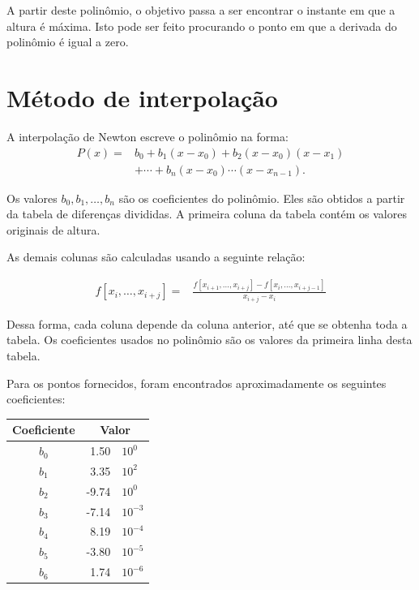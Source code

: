 \documentclass[12pt,brazil,a4paper, twocolumn]{article}
\begin{document}
A partir deste polinômio, o objetivo passa a ser encontrar o instante em que a altura é máxima. Isto pode ser feito procurando o ponto em que a derivada do polinômio é igual a zero.

\section{Método de interpolação}

A interpolação de Newton escreve o polinômio na forma:
\[
\begin{aligned}
P(x) ={}& b_0
+ b_1(x-x_0)
+ b_2(x-x_0)(x-x_1)\\
&+ \cdots
+ b_n(x-x_0)\cdots(x-x_{n-1}).
\end{aligned}
\]

\noindent
Os valores $b_0, b_1, \ldots, b_n$ são os coeficientes do polinômio. Eles são obtidos a partir da tabela de diferenças divididas. A primeira coluna da tabela contém os valores originais de altura.

As demais colunas são calculadas usando a seguinte relação:

\vspace{0.3cm}
\[
\begin{aligned}
f[x_i,\ldots,x_{i+j}]
={}&
\frac{
 f[x_{i+1},\ldots,x_{i+j}]
 -
 f[x_i,\ldots,x_{i+j-1}]
}{x_{i+j}-x_i}
\end{aligned}
\]

\vspace{0.2cm}

Dessa forma, cada coluna depende da coluna anterior, até que se obtenha toda a tabela. Os coeficientes usados no polinômio são os valores da primeira linha desta tabela.

Para os pontos fornecidos, foram encontrados aproximadamente os seguintes coeficientes:

\begin{center}
\begin{tabular}{c|r@{$\,\times\,$}l}
Coeficiente & \multicolumn{2}{c}{Valor}\\
\hline
$b_0$ & 1.50 & $10^{0}$\\
$b_1$ & 3.35 & $10^{2}$\\
$b_2$ & -9.74 & $10^{0}$\\
$b_3$ & -7.14 & $10^{-3}$\\
$b_4$ & 8.19 & $10^{-4}$\\
$b_5$ & -3.80 & $10^{-5}$\\
$b_6$ & 1.74 & $10^{-6}$\\
\end{tabular}
\end{center}
\end{document}
